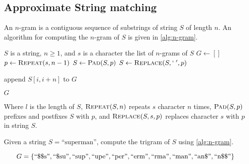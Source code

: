	\subsection{Approximate String matching}
	\label{sec:n-gram}
		\begin{defn}[N-Gram]
			An \(n\)-gram is a contiguous sequence of substrings of string \(S\) of length \(n\).	 An algorithm for computing the \(n\)-gram of \(S\) is given in \vref{alg:n-gram}. 
		\end{defn}
		

		\begin{algorithm}[!ht]
			\caption{\(\textsc{N-Gram}(S, n, s)\)}
			\label{alg:n-gram}
			
				\begin{algorithmic}[1]
					\REQUIRE \(S\) is a string, \(n \ge 1\), and \(s\) is a character
					\ENSURE the list of \(n\)-grams of \(S\)
					\medskip
					\STATE \(G \leftarrow []\)\label{alg:n-gram:G}
					\STATE \(p \leftarrow \textsc{Repeat}(s, n - 1)\)
					\STATE \(S \leftarrow \textsc{Pad}(S, p)\)
					\STATE \(S \leftarrow \textsc{Replace}(S, `\;', p)\)\label{alg:n-gram:S}
					
						\STATE append \(S[i, i + n]\) to \(G\)
					\ENDFOR
					
					\RETURN \(G\)
				\end{algorithmic}
		\end{algorithm}
		
		
		Where \(l\) is the length of \(S\), \(\textsc{Repeat}(S, n)\) repeats \(s\) character \(n\) times, \(\textsc{Pad}(S, p)\) prefixes and postfixes \(S\) with \(p\), and \(\textsc{Replace}(S, s, p)\) replaces character \(s\) with \(p\) in string \(S\).
		
		\begin{ex}
		\label{ex:ngram-banana}
			Given a string \(S = \text{``superman''}\), compute the trigram of \(S\) using \vref{alg:n-gram}.
			
			\[
				G = \{
					\text{``\char"24\char"24s''},
					\text{``\char"24su''},
					\text{``sup''},
					\text{``upe''},
					\text{``per''},
					\text{``erm''},
					\text{``rma''},
					\text{``man''},
					\text{``an\char"24''},
					\text{``n\char"24\char"24''}
				\}
			\]
		\end{ex}
		
